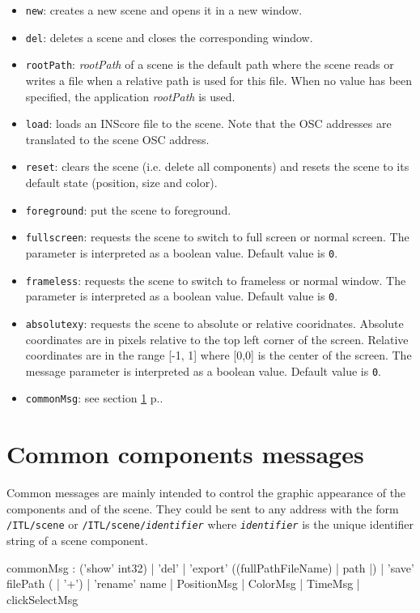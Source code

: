 \documentclass[a4paper,twoside]{report}
\newcommand{\toplevel}[1]	{\chapter{#1}}
\newcommand{\fullref}[1]	{\ref{#1} p.\pageref{#1}}
\newcommand{\OSC}[1]		{\texttt{#1}}
\newcommand{\values}[1]	{\texttt{#1}}
\begin{document}
\begin{itemize}
\item \OSC{new}: creates a new scene and opens it in a new window.
\item \OSC{del}: deletes a scene and closes the corresponding window.
\item \OSC{rootPath}: \emph{rootPath} of a scene is the default path where the scene reads or writes a file when a relative path is used for this file. When no value has been specified, the application  \emph{rootPath} is used.
\item \OSC{load}: loads an INScore file to the scene. Note that the OSC addresses are translated to the scene OSC address.
\item \OSC{reset}: clears the scene (i.e. delete all components) and resets the scene to its default state (position, size and color).
\item \OSC{foreground}: put the scene to foreground.
\item \OSC{fullscreen}: requests the scene to switch to full screen or normal screen.  The parameter is interpreted as a boolean value. Default value is \values{0}.
\item \OSC{frameless}: requests the scene to switch to frameless or normal window.  The parameter is interpreted as a boolean value. Default value is \values{0}.
\item \OSC{absolutexy}: requests the scene to absolute or relative cooridnates. Absolute coordinates are in pixels relative to the top left corner of the screen. Relative coordinates are in the range [-1, 1] where [0,0] is the center of the screen. The message parameter is interpreted as a boolean value. Default value is \values{0}.
\item \OSC{commonMsg}: see section \fullref{common}.
\end{itemize}


\toplevel{Common components messages}
\label{common}
Common messages are mainly intended to control the graphic appearance of the components and  of the scene.
They could be sent to any address with the form \OSC{/ITL/scene} or \OSC{/ITL/scene/\textit{identifier}} where \OSC{\textit{identifier}} is the unique identifier string of a scene component.
\begin{rail}
commonMsg :  ('show' int32)
			| 'del'
			| 'export' ((fullPathFileName) | path |)
			| 'save' filePath ( | '+')
			| 'rename' name
			| PositionMsg
			| ColorMsg
			| TimeMsg
			| clickSelectMsg
\end{rail}
\end{document}
